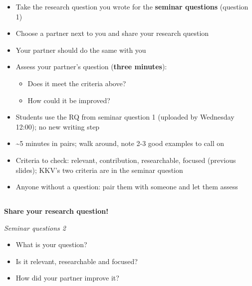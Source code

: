 \documentclass[
  letterpaper,
  DIV=11,
  numbers=noendperiod]{scrartcl}
\providecommand{\tightlist}{%
  \setlength{\itemsep}{0pt}\setlength{\parskip}{0pt}}
\begin{document}
\begin{itemize}
\tightlist
\item
  Take the research question you wrote for the \textbf{seminar
  questions} (question 1)\\
\item
  Choose a partner next to you and share your research question\\
\item
  Your partner should do the same with you\\
\item
  Assess your partner's question (\textbf{three minutes}):

  \begin{itemize}
  \tightlist
  \item
    Does it meet the criteria above?\\
  \item
    How could it be improved?
  \end{itemize}
\end{itemize}

\begin{itemize}
\tightlist
\item
  Students use the RQ from seminar question 1 (uploaded by Wednesday
  12:00); no new writing step
\item
  \textasciitilde5 minutes in pairs; walk around, note 2-3 good examples
  to call on
\item
  Criteria to check: relevant, contribution, researchable, focused
  (previous slides); KKV's two criteria are in the seminar question
\item
  Anyone without a question: pair them with someone and let them assess
\end{itemize}

\subsection{}\label{section-1}

\textbf{Share your research question!}

{\emph{Seminar questions 2}}

\begin{itemize}
\item
  What is your question?
\item
  Is it relevant, researchable and focused?
\item
  How did your partner improve it?
\end{itemize}
\end{document}
